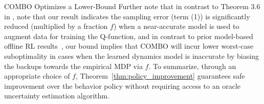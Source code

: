 \begin{subsection}{COMBO Optimizes a Lower-Bound}
Further note that in contrast to Theorem 3.6 in \citet{kumar2020conservative}, note that our result indicates the sampling error (term (1)) is significantly reduced (multiplied by a fraction $f$) when a near-accurate model is used to augment data for training the Q-function, and in contrast to prior model-based offline RL results~\cite{kidambi2020morel,yu2020mopo}, our bound implies that COMBO will incur lower worst-case suboptimality in cases when the learned dynamics model is inaccurate by biasing the backups towards the empirical MDP via $f$. To summarize,
through an appropriate choice of $f$, Theorem~\ref{thm:policy_improvement} guarantees safe improvement over the behavior policy without requiring access to an oracle uncertainty estimation algorithm.
\end{subsection}
